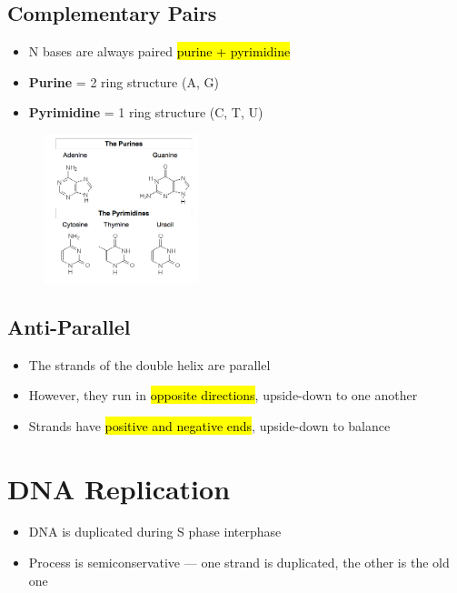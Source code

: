 \documentclass[a4paper,12pt]{article}
\begin{document}
\subsection{Complementary Pairs}
\begin{itemize}
    \item{N bases are always paired \hl{purine + pyrimidine}}
    \item{\textbf{Purine} = 2 ring structure (A, G)}
    \item{\textbf{Pyrimidine} = 1 ring structure (C, T, U)}
\end{itemize}

\begin{figure}[H]
    \centering
    \includegraphics[width=0.40\textwidth]{ring}
\end{figure}

\subsection{Anti-Parallel}
\begin{itemize}
    \item{The strands of the double helix are parallel}
    \item{However, they run in \hl{opposite directions}, upside-down to one another}
    \item{Strands have \hl{positive and negative ends}, upside-down to balance}
\end{itemize}

\section{DNA Replication}
\begin{itemize}
    \item{DNA is duplicated during S phase interphase}
    \item{Process is semiconservative --- one strand is duplicated, the other is the old one}
\end{itemize}
\end{document}
